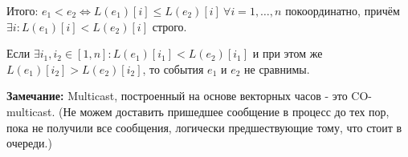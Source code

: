 Итого: $e_1 < e_2 \Leftrightarrow L(e_1)[i] \leq L(e_2)[i]\ \forall i = 1,\ldots, n$ покоординатно, причём $\exists i: L(e_1)[i] < L(e_2)[i]$ строго.

Если $\exists i_1, i_2 \in [1,n]: L(e_1)[i_1]< L(e_2)[i_1]$ и при этом же $L(e_1)[i_2] >  L(e_2)[i_2] $, то события $e_1$ и $e_2$ не сравнимы.

\textbf{Замечание:} Multicast, построенный на основе векторных часов - это CO-multicast. (Не можем доставить пришедшее сообщение в процесс до тех пор, пока не получили все сообщения, логически предшествующие тому, что стоит в  очереди.)
